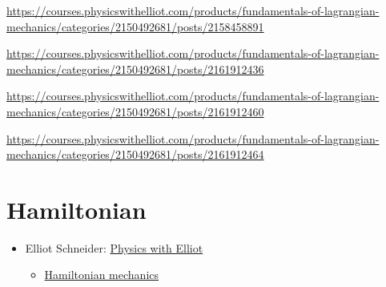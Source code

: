 \documentclass[
]{book}
\providecommand{\tightlist}{%
  \setlength{\itemsep}{0pt}\setlength{\parskip}{0pt}}
\theoremstyle{definition}
\theoremstyle{definition}
\theoremstyle{definition}
\theoremstyle{definition}
\theoremstyle{remark}
\begin{document}
\url{https://courses.physicswithelliot.com/products/fundamentals-of-lagrangian-mechanics/categories/2150492681/posts/2158458891}

\url{https://courses.physicswithelliot.com/products/fundamentals-of-lagrangian-mechanics/categories/2150492681/posts/2161912436}

\url{https://courses.physicswithelliot.com/products/fundamentals-of-lagrangian-mechanics/categories/2150492681/posts/2161912460}

\url{https://courses.physicswithelliot.com/products/fundamentals-of-lagrangian-mechanics/categories/2150492681/posts/2161912464}

\hypertarget{hamiltonian}{%
\chapter{Hamiltonian}\label{hamiltonian}}

\begin{itemize}
\tightlist
\item
  Elliot Schneider: \href{https://www.youtube.com/@PhysicswithElliot/playlists}{Physics with Elliot}

  \begin{itemize}
  \tightlist
  \item
    \href{https://www.youtube.com/playlist?list=PL-IZN8QRUw-zBECgfYLuDQ3qkWsXWAGhM}{Hamiltonian mechanics}
  \end{itemize}
\end{itemize}
\end{document}
